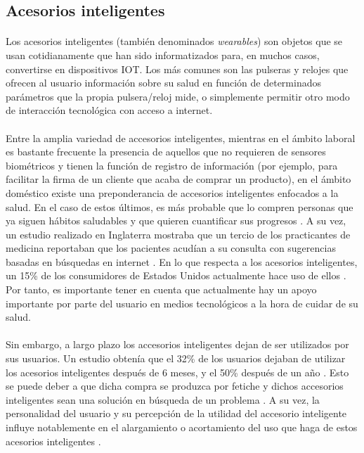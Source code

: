 \subsection{Acesorios inteligentes}
\label{subsec:accIntelig}
\paragraph{}
Los acesorios inteligentes (también denominados \textit{wearables}) son objetos que se usan cotidianamente que han sido informatizados para, en muchos casos, convertirse en dispositivos IOT. Los más comunes son las pulseras y relojes que ofrecen al usuario información sobre su salud en función de determinados parámetros que la propia pulsera/reloj mide, o simplemente permitir otro modo de interacción tecnológica con acceso a internet.

\paragraph{}
Entre la amplia variedad de accesorios inteligentes, mientras en el ámbito laboral es bastante frecuente la presencia de aquellos que no requieren de sensores biométricos y tienen la función de registro de información (por ejemplo, para facilitar la firma de un cliente que acaba de comprar un producto), en el ámbito doméstico existe una preponderancia de accesorios inteligentes enfocados a la salud. En  el caso de estos últimos, es más probable que lo compren personas que ya siguen hábitos saludables y que quieren cuantificar sus progresos \citep{bhas2013smart}. A su vez, un estudio realizado en Inglaterra mostraba que un tercio de los practicantes de medicina reportaban que los pacientes acudían a su consulta con sugerencias basadas en búsquedas en internet \citep{cello}. En lo que respecta a los acesorios inteligentes, un 15\% de los consumidores de Estados Unidos actualmente hace uso de ellos \citep{piwek2016rise}. Por tanto, es importante tener en cuenta que actualmente hay un apoyo importante por parte del usuario en medios tecnológicos a la hora de cuidar de su salud.

\paragraph{}
Sin embargo, a largo plazo los accesorios inteligentes dejan de ser utilizados por sus usuarios. Un estudio obtenía que el 32\% de los usuarios dejaban de utilizar los acesorios inteligentes después de 6 meses, y el 50\% después de un año \citep{ledger2014inside}. Esto se puede deber a que dicha compra se produzca por fetiche y dichos accesorios inteligentes sean una solución en búsqueda de un problema \citep{piwek2016rise}. A su vez, la personalidad del usuario y su percepción de la utilidad del accesorio inteligente influye notablemente en el alargamiento o acortamiento del uso que haga de estos acesorios inteligentes \citep{ehrenberg2008personality}.

